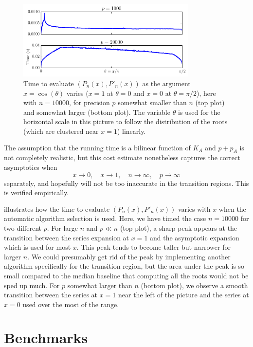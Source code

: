 \documentclass[nohypdvips,review]{siamart0216}
\begin{document}
\begin{figure}
\begin{centering}
\includegraphics[width=0.8\textwidth]{timeplot}
\caption{Time to evaluate $(P_n(x), P'_n(x))$ as the argument $x = \cos(\theta)$ varies ($x = 1$ at $\theta = 0$ and $x = 0$ at $\theta = \pi/2$), here with $n = 10000$, for
precision $p$ somewhat smaller than $n$ (top plot) and somewhat larger (bottom plot). The variable $\theta$ is used for the horizontal scale in this picture
to follow the distribution of the roots (which are clustered near $x = 1$) linearly.}
\label{fig:timeplot}
\end{centering}
\end{figure}

The assumption that the running time is a bilinear function of $K_A$ and $p + p_A$
is not completely realistic, but this cost estimate nonetheless captures the
correct asymptotics when
$$x \to 0, \quad x \to 1, \quad n \to \infty, \quad p \to \infty$$
separately, and hopefully will not be too inaccurate in the transition regions.
This is verified empirically.

 illustrates how the time to evaluate
$(P_n(x), P'_n(x))$ varies with $x$ when the automatic algorithm selection is used.
Here, we have timed the case $n = 10000$ for two different $p$.
For large $n$ and $p \ll n$ (top plot), a sharp peak appears at the transition between the series
expansion at $x = 1$ and the asymptotic expansion which is used for most $x$.
This peak tends to become taller
but narrower for larger $n$.
We could presumably get rid of the peak by implementing another algorithm
specifically for the transition region, but the area under the peak is so small
compared to the median baseline that computing all the roots
would not be sped up much.
For $p$ somewhat larger than $n$ (bottom plot), we observe a smooth transition between the
series at $x = 1$ near the left of the picture and the series at $x = 0$
used over the most of the range.

\section{Benchmarks}
\end{document}
